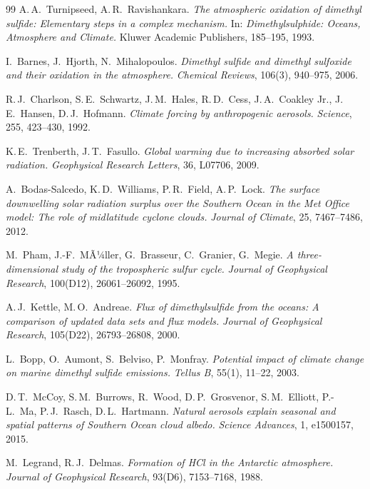 ﻿\documentclass[a4paper,12pt]{article}
\theoremstyle{definition}
\begin{document}
\begin{thebibliography}{99}
A.\,A.~Turnipseed, A.\,R.~Ravishankara.
\textit{The atmospheric oxidation of dimethyl sulfide: Elementary steps in a complex
mechanism.}
In: \textit{Dimethylsulphide: Oceans, Atmosphere and Climate.}
Kluwer Academic Publishers, 185--195, 1993.

I.~Barnes, J.~Hjorth, N.~Mihalopoulos.
\textit{Dimethyl sulfide and dimethyl sulfoxide and their oxidation in the atmosphere.}
\textit{Chemical Reviews}, 106(3), 940--975, 2006.

R.\,J.~Charlson, S.\,E.~Schwartz, J.\,M.~Hales, R.\,D.~Cess, J.\,A.~Coakley Jr.,
J.\,E.~Hansen, D.\,J.~Hofmann.
\textit{Climate forcing by anthropogenic aerosols.}
\textit{Science}, 255, 423--430, 1992.

K.\,E.~Trenberth, J.\,T.~Fasullo.
\textit{Global warming due to increasing absorbed solar radiation.}
\textit{Geophysical Research Letters}, 36, L07706, 2009.

A.~Bodas-Salcedo, K.\,D.~Williams, P.\,R.~Field, A.\,P.~Lock.
\textit{The surface downwelling solar radiation surplus over the Southern Ocean in the
Met Office model: The role of midlatitude cyclone clouds.}
\textit{Journal of Climate}, 25, 7467--7486, 2012.

M.~Pham, J.-F.~MÃ¼ller, G.~Brasseur, C.~Granier, G.~Megie.
\textit{A three-dimensional study of the tropospheric sulfur cycle.}
\textit{Journal of Geophysical Research}, 100(D12), 26061--26092, 1995.

A.\,J.~Kettle, M.\,O.~Andreae.
\textit{Flux of dimethylsulfide from the oceans: A comparison of updated data sets and
flux models.}
\textit{Journal of Geophysical Research}, 105(D22), 26793--26808, 2000.

L.~Bopp, O.~Aumont, S.~Belviso, P.~Monfray.
\textit{Potential impact of climate change on marine dimethyl sulfide emissions.}
\textit{Tellus B}, 55(1), 11--22, 2003.

D.\,T.~McCoy, S.\,M.~Burrows, R.~Wood, D.\,P.~Grosvenor, S.\,M.~Elliott,
P.-L.~Ma, P.\,J.~Rasch, D.\,L.~Hartmann.
\textit{Natural aerosols explain seasonal and spatial patterns of Southern Ocean cloud
albedo.}
\textit{Science Advances}, 1, e1500157, 2015.

M.~Legrand, R.\,J.~Delmas.
\textit{Formation of HCl in the Antarctic atmosphere.}
\textit{Journal of Geophysical Research}, 93(D6), 7153--7168, 1988.


\end{thebibliography}
\end{document}
